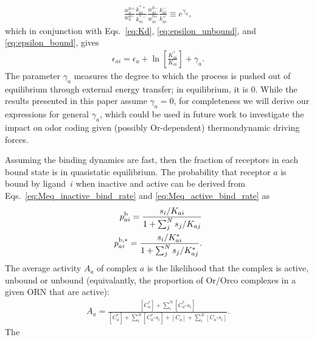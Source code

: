 \documentclass[9pt,twoside,lineno]{pnas-new}
\begin{document}
\begin{align}
\frac{w^{\text{u}+}_a}{w^{\text{u}-}_a}\frac{k^{*+}_{ai}}{k^{*-}_{ai}}\frac{w^{\text{b}-}_{ai}}{w^{\text{b}+}_{ai}}\frac{k^{-}_{ai}}{k^{+}_{ai}} \equiv e^{\gamma_a},
\label{eq:detailed_balance}
\end{align}
which in conjunction with Eqs.~\ref{eq:Kd},  \ref{eq:epsilon_unbound}, and \ref{eq:epsilon_bound}, gives
\begin{align}
\epsilon_{ai} = \epsilon_{a} + \ln\left[\frac{K^*_{ai}}{K_{ai}}\right] + \gamma_a.
\label{testing_equation}
\end{align}
The parameter $\gamma_a$ measures the degree to which the process is pushed out of equilibrium through external energy transfer; in equilibrium, it is 0. While the results presented in this paper assume $\gamma_a = 0$, for completeness we will derive our expressions for general $\gamma_a$, which could be used in future work to investigate the impact on odor coding given (possibly Or-dependent) thermondynamic driving forces. 

Assuming the binding dynamics are fast, then the fraction of receptors in each bound state is in quasistatic equilibrium. The probability that receptor $a$ is bound by ligand~$i$ when inactive and active can be derived from  Eqs.~\ref{eq:Meq_inactive_bind_rate} and \ref{eq:Meq_active_bind_rate} as
\begin{align}
p^{\text b}_{ai} = \frac{s_i/K_{ai}}{1 + \sum_j^Ns_j/K_{aj}} \label{eq:bound_prob_ai_inactive} \\
p^{\text b, *}_{ai} = \frac{s_i/K^*_{ai}}{1 + \sum_j^Ns_j/K^*_{aj}} \label{eq:bound_prob_ai_active}.
\end{align}
The average  activity $A_a$ of complex $a$ is the likelihood that the complex is active, unbound or unbound (equivalantly, the proportion of Or/Orco complexes in a given ORN that are active):
\begin{align}
A_a = \frac{[C^*_a] + \sum_i^N[C^*_a\text{-}s_i]}{[C^*_a] + \sum_i^N[C^*_a\text{-}s_i] + {[C_a] + \sum_i^N[C_a\text{-}s_i]}}.
\end{align} 
The 
\end{document}

